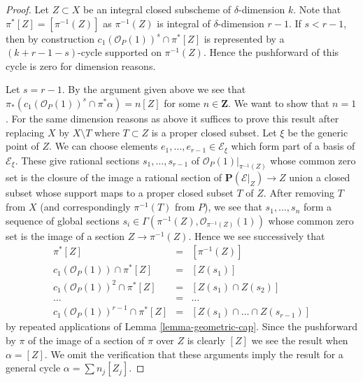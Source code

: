 \documentclass[10pt,a4paper]{amsart}
\theoremstyle{plain}
\theoremstyle{definition}
\theoremstyle{remark}
\numberwithin{equation}{subsection}
\begin{document}
\begin{proof}
Let $Z \subset X$ be an integral closed subscheme of $\delta$-dimension $k$.
Note that $\pi^*[Z] = [\pi^{-1}(Z)]$ as $\pi^{-1}(Z)$ is integral of
$\delta$-dimension $r - 1$.
If $s < r - 1$, then by construction
$c_1(\mathcal{O}_P(1))^s \cap \pi^*[Z]$
is represented by a $(k + r - 1 - s)$-cycle supported on
$\pi^{-1}(Z)$. Hence the pushforward of this cycle
is zero for dimension reasons.

\medskip\noindent
Let $s = r - 1$. By the argument given above we see that
$\pi_*(c_1(\mathcal{O}_P(1))^s \cap \pi^*\alpha) = n [Z]$
for some $n \in \mathbf{Z}$. We want to show that $n = 1$.
For the same dimension reasons
as above it suffices to prove this result after replacing $X$ by
$X \setminus T$ where $T \subset Z$ is a proper closed subset.
Let $\xi$ be the generic point of $Z$.
We can choose elements $e_1, \ldots, e_{r - 1} \in \mathcal{E}_\xi$
which form part of a basis of $\mathcal{E}_\xi$.
These give rational sections $s_1, \ldots, s_{r - 1}$
of $\mathcal{O}_P(1)|_{\pi^{-1}(Z)}$ whose common zero set
is the closure of the image a rational section of
$\mathbf{P}(\mathcal{E}|_Z) \to Z$ union a closed subset whose
support maps to a proper closed subset $T$ of $Z$.
After removing $T$ from $X$ (and correspondingly $\pi^{-1}(T)$
from $P$), we see that $s_1, \ldots, s_n$ form a sequence
of global sections
$s_i \in \Gamma(\pi^{-1}(Z), \mathcal{O}_{\pi^{-1}(Z)}(1))$
whose common zero set is the image of a section $Z \to \pi^{-1}(Z)$.
Hence we see successively that
\begin{eqnarray*}
\pi^*[Z] & = & [\pi^{-1}(Z)] \\
c_1(\mathcal{O}_P(1)) \cap \pi^*[Z] & = & [Z(s_1)] \\
c_1(\mathcal{O}_P(1))^2 \cap \pi^*[Z] & = & [Z(s_1) \cap Z(s_2)] \\
\ldots & = & \ldots \\
c_1(\mathcal{O}_P(1))^{r - 1} \cap \pi^*[Z] & = &
[Z(s_1) \cap \ldots \cap Z(s_{r - 1})]
\end{eqnarray*}
by repeated applications of Lemma \ref{lemma-geometric-cap}.
Since the pushforward by $\pi$ of the image of a
section of $\pi$ over $Z$ is clearly $[Z]$ we see the result
when $\alpha = [Z]$. We omit the verification that these
arguments imply the result for a general cycle $\alpha = \sum n_j [Z_j]$.
\end{proof}
\end{document}
